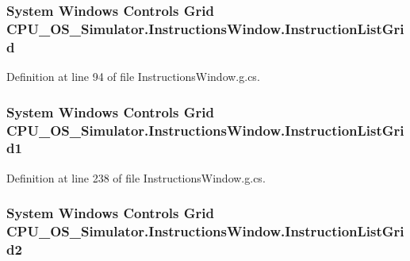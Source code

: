 \subsubsection[{Instruction\+List\+Grid}]{\setlength{\rightskip}{0pt plus 5cm}System Windows Controls Grid C\+P\+U\+\_\+\+O\+S\+\_\+\+Simulator.\+Instructions\+Window.\+Instruction\+List\+Grid\hspace{0.3cm}{\ttfamily [package]}}\label{class_c_p_u___o_s___simulator_1_1_instructions_window_af568f7891b3381f9bec2f0d5b2d0d8c6}


Definition at line 94 of file Instructions\+Window.\+g.\+cs.

\hypertarget{class_c_p_u___o_s___simulator_1_1_instructions_window_a8f09b0005016c225169d7e9dd2724053}{}
\subsubsection[{Instruction\+List\+Grid1}]{\setlength{\rightskip}{0pt plus 5cm}System Windows Controls Grid C\+P\+U\+\_\+\+O\+S\+\_\+\+Simulator.\+Instructions\+Window.\+Instruction\+List\+Grid1\hspace{0.3cm}{\ttfamily [package]}}\label{class_c_p_u___o_s___simulator_1_1_instructions_window_a8f09b0005016c225169d7e9dd2724053}


Definition at line 238 of file Instructions\+Window.\+g.\+cs.

\hypertarget{class_c_p_u___o_s___simulator_1_1_instructions_window_a33108da9779c5108fc5dd303a8d33454}{}
\subsubsection[{Instruction\+List\+Grid2}]{\setlength{\rightskip}{0pt plus 5cm}System Windows Controls Grid C\+P\+U\+\_\+\+O\+S\+\_\+\+Simulator.\+Instructions\+Window.\+Instruction\+List\+Grid2\hspace{0.3cm}{\ttfamily [package]}}\label{class_c_p_u___o_s___simulator_1_1_instructions_window_a33108da9779c5108fc5dd303a8d33454}


